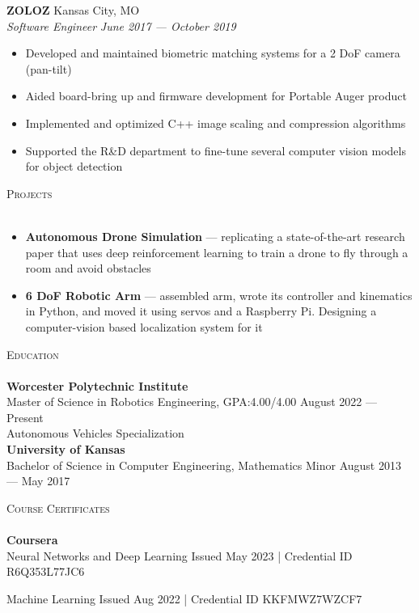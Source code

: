 \documentclass[a4paper]{article}
\newcommand{\lineunder} {
    \vspace*{-8pt} \\
    \hspace*{-18pt} \hrulefill \\
}
\newcommand{\header} [1] {
    {\hspace*{-18pt}\vspace*{6pt} \textsc{#1}}
    \vspace*{-6pt} \lineunder
}
\begin{document}
\textbf{ZOLOZ} \hfill Kansas City, MO\\
\textit{Software Engineer} \hfill \textit{June 2017 --- October 2019}\\
\vspace{-1mm}
\begin{itemize} \itemsep 1pt
	\item Developed and maintained biometric matching systems for a 2 DoF camera (pan-tilt)
	\item Aided board-bring up and firmware development for Portable Auger product
	\item Implemented and optimized C++ image scaling and compression algorithms
	\item Supported the R\&D department to fine-tune several computer vision models for object detection
\end{itemize}

\header{Projects}
\vspace{-1mm}
\begin{itemize} \itemsep 1pt
    \item \textbf{Autonomous Drone Simulation} --- replicating a state-of-the-art research paper that uses deep reinforcement
    learning to train a drone to fly through a room and avoid obstacles
    \item \textbf{6 DoF Robotic Arm} --- assembled arm, wrote its controller and kinematics in Python, and moved it using servos and a Raspberry Pi. Designing a computer-vision based localization system for it
\end{itemize}

\header{Education}
\textbf{Worcester Polytechnic Institute}\\
Master of Science in Robotics Engineering, GPA:\@ 4.00/4.00 \hfill August 2022 --- Present\\
Autonomous Vehicles Specialization\\
\vspace{2mm}
\textbf{University of Kansas}\\
Bachelor of Science in Computer Engineering, Mathematics Minor \hfill August 2013 --- May 2017\\

\vspace{2mm}

\header{Course Certificates}
{\textbf{Coursera}}\\
\vspace{1.75mm}
Neural Networks and Deep Learning \hfill Issued May 2023 | \footnotesize{Credential ID R6Q353L77JC6}

\normalsize{}

\vspace{1mm}
Machine Learning \hfill Issued Aug 2022 | \footnotesize{Credential ID KKFMWZ7WZCF7}
\end{document}
